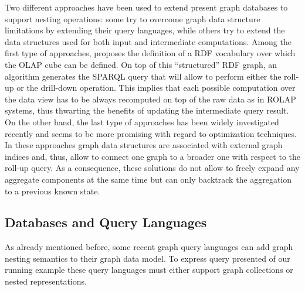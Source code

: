  Two different approaches have been used to extend present graph databases to support nesting operations:
some try to overcome graph data structure limitations by extending their query languages, while others try to extend the data structures used for both input and intermediate computations. Among the first type of approaches, \cite{Etcheverry2012} proposes the definition of a RDF  vocabulary over which the OLAP  cube can be defined. On top of this ``structured'' RDF graph, an algorithm generates the SPARQL query that will allow to perform either the roll-up or the drill-down operation. This implies that each possible computation over the data view has to be always recomputed on top of the raw data as in ROLAP systems, thus thwarting the benefits of updating the intermediate query result. On the other hand, the last type of approaches has been widely investigated recently and seems to be more promising with regard to optimization techniques. In these approaches \cite{Tian20085,ChenYZHY08,Qu2011} graph data structures are associated with external graph indices and, thus, allow to connect one graph to a broader one with respect to the roll-up query. As a consequence, these solutions do not allow to freely expand any aggregate components at the same time but can only backtrack the aggregation to a previous known state. %


\subsection{Databases and Query Languages}\label{subsec:pathsumm}
As already mentioned before, some recent graph query languages can add graph nesting semantics to their graph data model. To express query presented of our running example these query languages must either support graph collections or nested representations.


